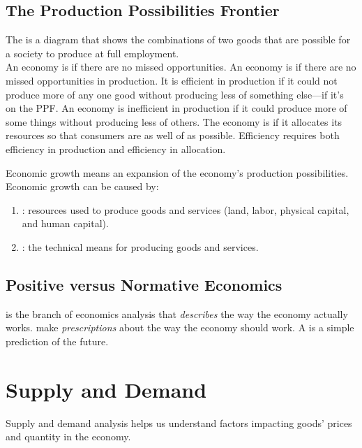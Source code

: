 \documentclass{article}
\begin{document}
\subsection{The Production Possibilities Frontier}

The  is a diagram that shows the combinations of two goods that are possible for a society to produce at full employment. \\ 

An economy is  if there are no missed opportunities. An economy is  if there are no missed opportunities in production. It is efficient in production if it could not produce more of any one good without producing less of something else---if it's on the PPF. An economy is inefficient in production if it could produce more of some things without producing less of others. The economy is  if it allocates its resources so that consumers are as well of as possible. Efficiency requires both efficiency in production and efficiency in allocation. 

Economic growth means an expansion of the economy's production possibilities. Economic growth can be caused by: 
\begin{enumerate}
  \item {}: resources used to produce goods and services (land, labor, physical capital, and human capital). 
  \item {}: the technical means for producing goods and services. 
\end{enumerate}

\subsection{Positive versus Normative Economics}

 is the branch of economics analysis that \emph{describes} the way the economy actually works.  make \emph{prescriptions} about the way the economy should work. A  is a simple prediction of the future. 

\section{Supply and Demand}

Supply and demand analysis helps us understand factors impacting goods' prices and quantity in the economy. 
\end{document}
